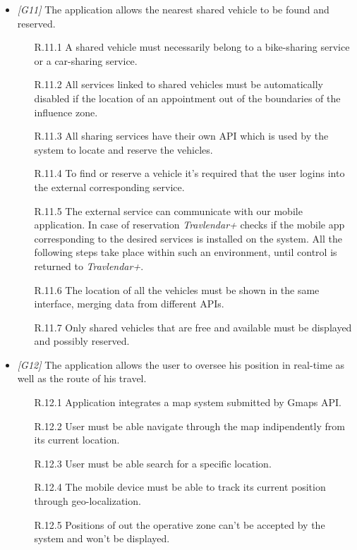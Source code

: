 \begin{itemize}
	\item \textit{[G11]} The application allows the nearest shared vehicle to be found and reserved.
		\begin{itemize}
			\item [R.11.1] A shared vehicle must necessarily belong to a bike-sharing service or a car-sharing service.
			\item [R.11.2] All services linked to shared vehicles must be automatically disabled if the location of an appointment out of the boundaries of the influence zone.
			\item [R.11.3] All sharing services have their own API which is used by the system to locate and reserve the vehicles.
			\item [R.11.4] To find or reserve a vehicle it's required that the user logins into the external corresponding service.
			\item [R.11.5] The external service can communicate with our mobile application. In case of reservation \textit{Travlendar+} checks if the mobile app corresponding to the desired services is installed on the system. All the following steps take place within such an environment, until control is returned to \textit{Travlendar+}.
			\item [R.11.6] The location of all the vehicles must be shown in the same interface, merging data from different APIs.
			\item[R.11.7] Only shared vehicles that are free and available must be displayed and possibly reserved.
		\end{itemize}


	\item \textit{[G12]} The application allows the user to oversee his position in real-time as well as the route of his travel.
		\begin{itemize}
			\item [R.12.1] Application integrates a map system submitted by Gmaps API.
			\item [R.12.2] User must be able navigate through the map indipendently from its current location.
			\item [R.12.3] User must be able search for a specific location.
			\item [R.12.4] The mobile device must be able to track its current position through geo-localization.
			\item [R.12.5] Positions of out the operative zone can't be accepted by the system and won't be displayed.
		\end{itemize}



\end{itemize}
